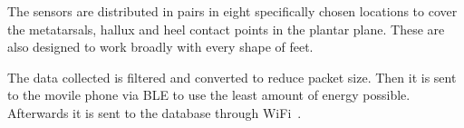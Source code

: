 The sensors are distributed in pairs in eight specifically chosen locations to cover the metatarsals, hallux and heel contact points in the plantar plane. 
These are also designed to work broadly with every shape of feet.

\begin{figure}[htbp]
    \centering
    \label{fig:insole}
  \end{figure}

The data collected is filtered and converted to reduce packet size. Then it is sent to the movile phone via BLE to use the least amount of energy possible. Afterwards it is sent to the database through WiFi~\cite{masterInsole}.




